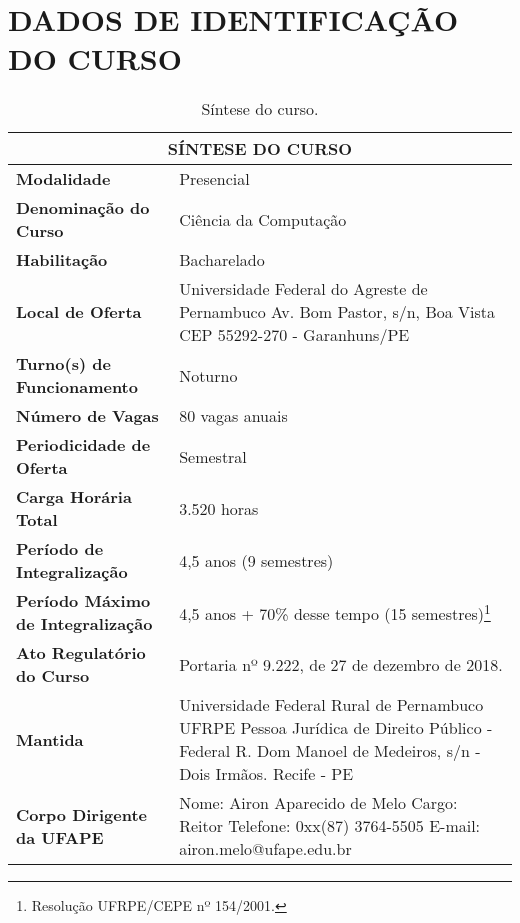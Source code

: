 \documentclass[
	12pt,				%
	openright,			%
  oneside,     %
	a4paper,			%
	english,			%
	french,				%
	spanish,			%
	brazil				%
	]{abntex2}
\begin{document}

\chapter*[Dados de Identificação do Curso]{DADOS DE IDENTIFICAÇÃO DO CURSO}


\begin{center}
\begin{footnotesize} 
\begin{longtable}{lp{9.4cm}}
  \caption{\label{quadro:sintese-do-curso}Síntese do curso.}\\
  \toprule
  \multicolumn{2}{c}{\bfseries SÍNTESE DO CURSO} \\
  \midrule
  \textbf{Modalidade} & Presencial \\ \midrule
  \textbf{Denominação do Curso}	& Ciência da Computação \\ \midrule
  \textbf{Habilitação}	& Bacharelado \\ \midrule
  \textbf{Local de Oferta}	& Universidade Federal do Agreste de Pernambuco \newline Av. Bom Pastor, s/n, Boa Vista \newline CEP 55292-270 - Garanhuns/PE \\ \midrule
  \textbf{Turno(s) de Funcionamento}	 & Noturno \\ \midrule
  \textbf{Número de Vagas}	& 80 vagas anuais \\ \midrule
  \textbf{Periodicidade de Oferta}	& Semestral \\ \midrule
  \textbf{Carga Horária Total} & 3.520 horas \\ \midrule
  \textbf{Período de Integralização}	& 4,5 anos (9 semestres) \\ \midrule
  \textbf{Período Máximo de Integralização} 	& 4,5 anos + 70\% desse tempo (15 semestres)\footnote{Resolução UFRPE/CEPE nº 154/2001.} \\ \midrule
  \textbf{Ato Regulatório do Curso} &	Portaria nº 9.222, de 27 de dezembro de 2018. \\ \midrule
  \textbf{Mantida}	& Universidade Federal Rural de Pernambuco UFRPE \newline Pessoa Jurídica de Direito Público - Federal \newline R. Dom Manoel de Medeiros, s/n - Dois Irmãos. Recife - PE \\ \midrule
  \textbf{Corpo Dirigente da UFAPE}	& Nome: Airon Aparecido de Melo \newline Cargo: Reitor \newline Telefone: 0xx(87) 3764-5505 \newline E-mail: airon.melo@ufape.edu.br \\
\bottomrule
\end{longtable}
\end{footnotesize}
\end{center}
\end{document}
